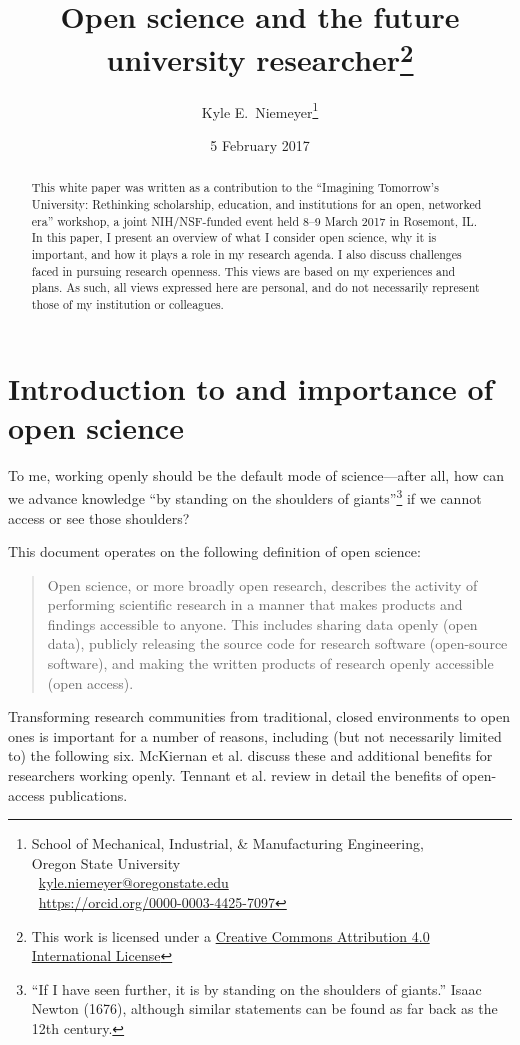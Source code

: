 \documentclass[nobib]{tufte-handout}
\title{Open science and the future university researcher\thanks{This
work is licensed under a
\href{https://creativecommons.org/licenses/by/4.0/}{Creative Commons Attribution
4.0 International License} \ccby}}
\author[Kyle E.~Niemeyer]{Kyle E.~Niemeyer\thanks{
School of Mechanical, Industrial, \& Manufacturing Engineering,\\
\noindent Oregon State University\\
\noindent \faEnvelopeO~\href{mailto:kyle.niemeyer@oregonstate.edu}{kyle.niemeyer@oregonstate.edu}\\
\noindent \inlinegraphics{orcid_128x128.png}~{\scriptsize\href{https://orcid.org/0000-0003-4425-7097}{https://orcid.org/0000-0003-4425-7097}}
}}
\date{5 February 2017} %
\begin{document}
\maketitle%

\begin{abstract}
\noindent
This white paper was written as a contribution to the ``Imagining Tomorrow's University:
Rethinking scholarship, education, and institutions for an open, networked era''
workshop, a joint NIH\slash NSF-funded event held 8--9 March 2017 in Rosemont, IL.
In this paper, I present an overview of what I consider open science,
why it is important, and how it plays a role in my research agenda.
I also discuss challenges faced in pursuing research openness.
This views are based on my experiences and plans. As such, all views expressed
here are personal, and do not necessarily represent those
of my institution or colleagues.
\end{abstract}

\section{Introduction to and importance of open science}
\label{sec:intro}

To me, working openly should be the default mode of science---after all, how can
we advance knowledge ``by standing on the shoulders of giants''\footnote{``If I
have seen further, it is by standing on the shoulders of giants.'' Isaac
Newton (1676), although similar statements can be found as far back as the 12th
century.} if we cannot access or see those shoulders?

This document operates on the following definition of open science:
\begin{quote}
Open science, or more broadly open research, describes the activity of performing
scientific research in a manner that makes products and findings accessible to
anyone. This includes sharing data openly (open data), publicly releasing the
source code for research software (open-source software), and making the written
products of research openly accessible (open access).
\end{quote}

Transforming research communities from traditional, closed environments to open
ones is important for a number of reasons, including (but not necessarily limited
to) the following six. McKiernan et al.\autocite{McKiernan:2016iz} discuss these
and additional benefits for researchers working openly. Tennant et al.\autocite{Tennant:2016bi}
review in detail the benefits of open-access publications.
\end{document}

